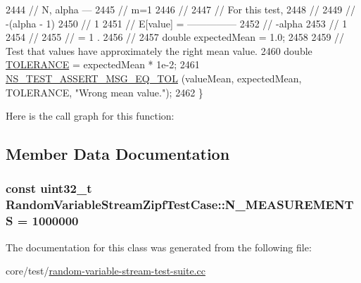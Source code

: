 \begin{DoxyCode}
2444   \textcolor{comment}{//      N, alpha     ---}
2445   \textcolor{comment}{//                   m=1    }
2446   \textcolor{comment}{//                 }
2447   \textcolor{comment}{// For this test,}
2448   \textcolor{comment}{//}
2449   \textcolor{comment}{//                      -(alpha - 1)}
2450   \textcolor{comment}{//                     1}
2451   \textcolor{comment}{//     E[value]  =  ---------------}
2452   \textcolor{comment}{//                      -alpha}
2453   \textcolor{comment}{//                     1}
2454   \textcolor{comment}{//}
2455   \textcolor{comment}{//               =  1  .}
2456   \textcolor{comment}{//               }
2457   \textcolor{keywordtype}{double} expectedMean = 1.0;
2458 
2459   \textcolor{comment}{// Test that values have approximately the right mean value.}
2460   \textcolor{keywordtype}{double} \hyperlink{spectrum-value-test_8cc_a30c17564229ec2e37dfea9c6c9ad643e}{TOLERANCE} = expectedMean * 1e-2;
2461   \hyperlink{group__testing_ga9e7861b56b4e70db3b56044cb7a28e41}{NS\_TEST\_ASSERT\_MSG\_EQ\_TOL} (valueMean, expectedMean, TOLERANCE, \textcolor{stringliteral}{"Wrong mean
       value."}); 
2462 \}
\end{DoxyCode}


Here is the call graph for this function\+:




\subsection{Member Data Documentation}
\subsubsection[{\texorpdfstring{N\+\_\+\+M\+E\+A\+S\+U\+R\+E\+M\+E\+N\+TS}{N_MEASUREMENTS}}]{\setlength{\rightskip}{0pt plus 5cm}const uint32\+\_\+t Random\+Variable\+Stream\+Zipf\+Test\+Case\+::\+N\+\_\+\+M\+E\+A\+S\+U\+R\+E\+M\+E\+N\+TS = 1000000\hspace{0.3cm}{\ttfamily [static]}}\hypertarget{classRandomVariableStreamZipfTestCase_a452b211d67b349e2e54898720f68901f}{}\label{classRandomVariableStreamZipfTestCase_a452b211d67b349e2e54898720f68901f}


The documentation for this class was generated from the following file\+:\begin{DoxyCompactItemize}
\item 
core/test/\hyperlink{random-variable-stream-test-suite_8cc}{random-\/variable-\/stream-\/test-\/suite.\+cc}\end{DoxyCompactItemize}
